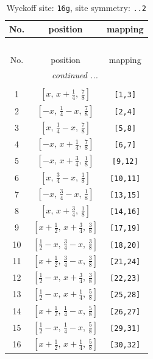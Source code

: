 \documentclass[fleqn,8pt]{jsarticle}
\begin{document}
\renewcommand{\arraystretch}{1.2}
\begin{longtable}{ccc}
\caption{Wyckoff site: {\tt 16g}, site symmetry: {\tt ..2}}
 \\
 \hline \hline
No. & position & mapping \\ \hline \endfirsthead

\multicolumn{2}{l}{\tablename\ \thetable{}} \\
 \hline \hline
No. & position & mapping \\ \hline \endhead

 \hline \hline
\multicolumn{2}{r}{\footnotesize\it continued ...} \\ \endfoot

 \hline \hline
\multicolumn{2}{r}{} \\ \endlastfoot

1 & $\left[ x,\, x + \frac{1}{4},\, \frac{7}{8} \right]$ & {\tt [1,3]} \\ \hline
2 & $\left[ - x,\, \frac{1}{4} - x,\, \frac{7}{8} \right]$ & {\tt [2,4]} \\ \hline
3 & $\left[ x,\, \frac{1}{4} - x,\, \frac{7}{8} \right]$ & {\tt [5,8]} \\ \hline
4 & $\left[ - x,\, x + \frac{1}{4},\, \frac{7}{8} \right]$ & {\tt [6,7]} \\ \hline
5 & $\left[ - x,\, x + \frac{3}{4},\, \frac{1}{8} \right]$ & {\tt [9,12]} \\ \hline
6 & $\left[ x,\, \frac{3}{4} - x,\, \frac{1}{8} \right]$ & {\tt [10,11]} \\ \hline
7 & $\left[ - x,\, \frac{3}{4} - x,\, \frac{1}{8} \right]$ & {\tt [13,15]} \\ \hline
8 & $\left[ x,\, x + \frac{3}{4},\, \frac{1}{8} \right]$ & {\tt [14,16]} \\ \hline
9 & $\left[ x + \frac{1}{2},\, x + \frac{3}{4},\, \frac{3}{8} \right]$ & {\tt [17,19]} \\ \hline
10 & $\left[ \frac{1}{2} - x,\, \frac{3}{4} - x,\, \frac{3}{8} \right]$ & {\tt [18,20]} \\ \hline
11 & $\left[ x + \frac{1}{2},\, \frac{3}{4} - x,\, \frac{3}{8} \right]$ & {\tt [21,24]} \\ \hline
12 & $\left[ \frac{1}{2} - x,\, x + \frac{3}{4},\, \frac{3}{8} \right]$ & {\tt [22,23]} \\ \hline
13 & $\left[ \frac{1}{2} - x,\, x + \frac{1}{4},\, \frac{5}{8} \right]$ & {\tt [25,28]} \\ \hline
14 & $\left[ x + \frac{1}{2},\, \frac{1}{4} - x,\, \frac{5}{8} \right]$ & {\tt [26,27]} \\ \hline
15 & $\left[ \frac{1}{2} - x,\, \frac{1}{4} - x,\, \frac{5}{8} \right]$ & {\tt [29,31]} \\ \hline
16 & $\left[ x + \frac{1}{2},\, x + \frac{1}{4},\, \frac{5}{8} \right]$ & {\tt [30,32]} \\
\end{longtable}
\end{document}
